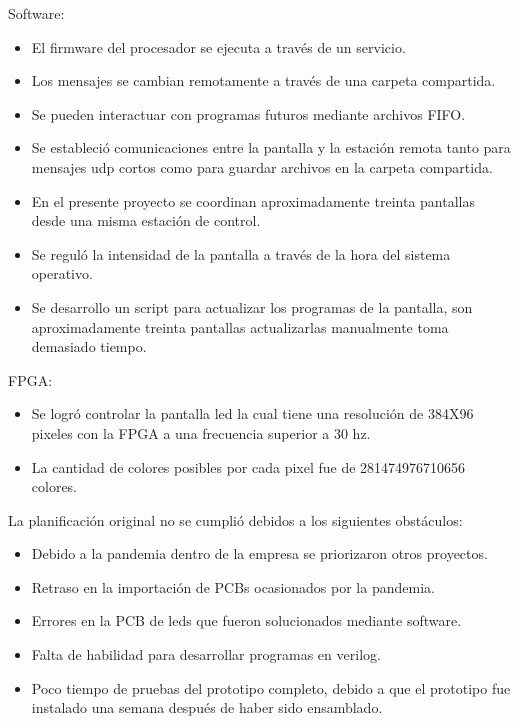 Software:
\begin{itemize}
\item El firmware del procesador se ejecuta a través de un servicio.
\item Los mensajes se cambian remotamente a través de una carpeta compartida.
\item Se pueden interactuar con programas futuros mediante archivos FIFO.
\item Se estableció comunicaciones entre la pantalla y la estación remota tanto para mensajes udp cortos como para guardar archivos en la carpeta compartida.
\item En el presente proyecto se coordinan aproximadamente treinta pantallas desde una misma estación de control.
\item Se reguló la intensidad de la pantalla a través de la hora del sistema operativo.
\item Se desarrollo un script para actualizar los programas de la pantalla, son aproximadamente treinta pantallas actualizarlas manualmente toma demasiado tiempo.

\end{itemize}

FPGA:
\begin{itemize}
\item Se logró controlar la pantalla led la cual tiene una resolución de 384X96 pixeles con la FPGA a una frecuencia superior a 30 hz.
\item La cantidad de colores posibles por cada pixel fue de 281474976710656 colores.
\end{itemize}



La planificación original no se cumplió debidos a los siguientes obstáculos:
\begin{itemize}
\item Debido a la pandemia dentro de la empresa se priorizaron otros proyectos.
\item Retraso en la importación de PCBs ocasionados por la pandemia.
\item Errores en la PCB de leds que fueron solucionados mediante software.
\item Falta de habilidad para desarrollar programas en verilog.
\item Poco tiempo de pruebas del prototipo completo, debido a que el prototipo fue instalado una semana después de haber sido ensamblado.

\end{itemize}

